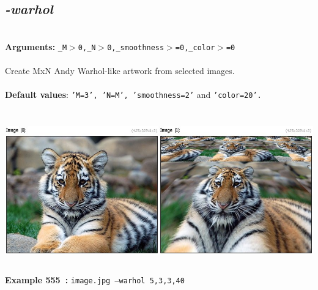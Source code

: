 \documentclass[a4paper,11pt,twoside]{book}
\begin{document}
\subsection{\emph{-warhol} }\vspace*{-0.5em}
~\\\textbf{Arguments: } 
{\small \texttt{\_M$>$0,\_N$>$0,\_smoothness$>$=0,\_color$>$=0}}\\~\\
Create MxN Andy Warhol-like artwork from selected images.
~\\~\\\textbf{Default values}: {\small \texttt{'M=3', 'N=M', 'smoothness=2'} and \texttt{'color=20'.}}
\begin{center}\includegraphics[keepaspectratio=true,height=7cm,width=\textwidth]{img/gmic_def555.jpg}\\
{\footnotesize \textbf{Example 555~:} \texttt{image.jpg --warhol 5,3,3,40}}
\end{center}
\end{document}
